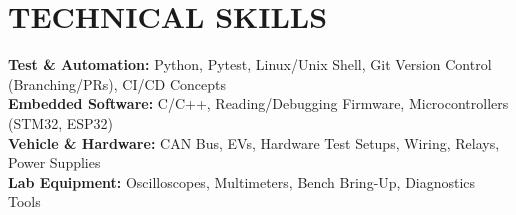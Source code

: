 \documentclass[letterpaper,11pt]{article}
\begin{document}
\section{TECHNICAL SKILLS}
 \begin{itemize}[leftmargin=0.15in, label={}]
    \small{\item{
     \textbf{Test \& Automation:} Python, Pytest, Linux/Unix Shell, Git Version Control (Branching/PRs), CI/CD Concepts \\
     \textbf{Embedded Software:} C/C++, Reading/Debugging Firmware, Microcontrollers (STM32, ESP32) \\
     \textbf{Vehicle \& Hardware:} CAN Bus, EVs, Hardware Test Setups, Wiring, Relays, Power Supplies \\
     \textbf{Lab Equipment:} Oscilloscopes, Multimeters, Bench Bring-Up, Diagnostics Tools
    }}
 \end{itemize}


\end{document}
